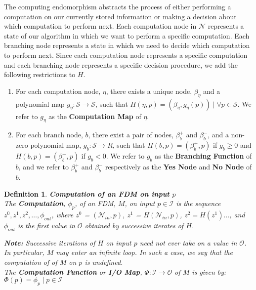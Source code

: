 \documentclass[twoside]{article}
\newcommand{\inspace}[0]{\mathcal{I}}
\newcommand{\outspace}[0]{\mathcal{O}}
\newcommand{\statespace}[0]{\mathcal{S}}
\newcommand{\nodes}[0]{\mathcal{N}}
\newcommand{\nodein}[0]{\nodes_{in}}
\newcommand{\functype}[3]{$#1:#2 \rightarrow #3$}
\newcommand{\computefn}[0]{\Phi}
\newcommand{\note}[1]{{\textbf{Note:} #1}}
\newcommand{\compute}[0]{\phi}
\newcommand{\computeout}[0]{\phi_{out}}
\newtheorem{definition}[theorem]{Definition}
\begin{document}
  The computing endomorphism abstracts the process of either
  performing a computation on our currently stored information or
  making a decision about which computation to perform next.  Each
  computation node in $\nodes$ represents a state of our algorithm in
  which we want to perform a specific computation.  Each branching
  node represents a state in which we need to decide which computation
  to perform next.  Since each computation node represents a specific computation and
  each branching node represents a specific decision procedure, we add the following 
  restrictions to $H$.

  \begin{enumerate}

  \item For each computation node, $\eta$, there exists a unique node,
    $\beta_\eta$ and a polynomial map
    \functype{g_\eta}{\statespace}{\statespace}, such that $H(\eta, p)
    = (\beta_\eta, g_\eta(p)) \mid \forall p \in \statespace$.  We
    refer to $g_\eta$ as the \textbf{Computation Map} of $\eta$.

  \item For each branch node, $b$, there exist a pair of nodes,
    $\beta_b^+$ and $\beta_b^-$, and a non-zero polynomial map,
    \functype{g_b}{\statespace}{R}, such that $H(b, p) = (\beta_b^+,
    p)$ if $g_b \geq 0$ and $H(b,p) = (\beta_b^-, p)$ if $g_b < 0$.
    We refer to $g_b$ as the \textbf{Branching Function} of $b$, and
    we refer to $\beta_b^+$ and $\beta_b^-$ respectively as the
    \textbf{Yes Node} and \textbf{No Node} of $b$.

  \end{enumerate}

  \begin{definition}{\textbf{Computation of an FDM on input $p$}}\\
    
    The \textbf{Computation}, $\compute_p$, of an FDM, $M$, on input
    $p \in \inspace$ is the sequence $z^0, z^1, z^2, \ldots, \computeout$,
    where $z^0$ = $(\nodein, p)$, $z^1$ = $H(\nodein, p)$, $z^2 =
    H(z^1) \ldots$, and $\computeout$ is the first value in $\outspace$
    obtained by successive iterates of $H$.

    \emph{\note{Successive iterations of $H$ on input $p$ need
        not ever take on a value in $\outspace$.  In particular, $M$
        may enter an infinite loop.  In such a case, we say that the
        computation of of $M$ on $p$ is undefined.}}\\

    The \textbf{Computation Function} or \textbf{I/O Map},
    \functype{\computefn}{\inspace}{\outspace} of $M$ is
    given by: $\computefn(p) = \compute_p \mid  p \in \inspace$
  \end{definition}
\end{document}
